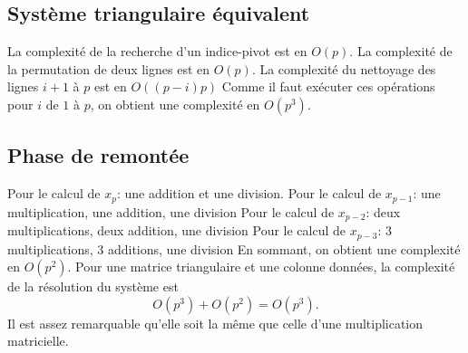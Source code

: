 \subsection{Système triangulaire équivalent}
La complexité de la recherche d'un indice-pivot est en $O(p)$.\newline
La complexité de la permutation de deux lignes est en $O(p)$.\newline
La complexité du nettoyage des lignes $i+1$ à $p$ est en $O((p-i)p)$\newline
Comme il faut exécuter ces opérations pour $i$ de $1$ à $p$, on obtient une complexité en $O(p^3)$. 
\subsection{Phase de remontée}
Pour le calcul de $x_p$: une addition et une division.\newline
Pour le calcul de $x_{p-1}$: une multiplication, une addition, une division\newline
Pour le calcul de $x_{p-2}$: deux multiplications, deux addition, une division\newline
Pour le calcul de $x_{p-3}$: $3$ multiplications, $3$ additions, une division\newline
En sommant, on obtient une complexité en $O(p^2)$.\newline
Pour une matrice triangulaire et une colonne données, la complexité de la résolution du système est 
\begin{displaymath}
  O(p^3) + O(p^2) = O(p^3). 
\end{displaymath}
Il est assez remarquable qu'elle soit la même que celle d'une multiplication matricielle.

